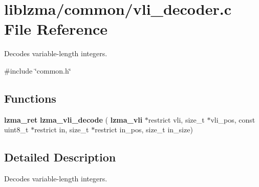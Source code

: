 \section{liblzma/common/vli\+\_\+decoder.c File Reference}
\label{vli__decoder_8c}


Decodes variable-\/length integers.  


{\ttfamily \#include \char`\"{}common.\+h\char`\"{}}\newline
\subsection*{Functions}
\begin{DoxyCompactItemize}
\item 
\mbox{\label{vli__decoder_8c_aba209ec14273c2c05697bd76529b6969}} 
\textbf{ lzma\+\_\+ret} {\bfseries lzma\+\_\+vli\+\_\+decode} (\textbf{ lzma\+\_\+vli} $\ast$restrict vli, size\+\_\+t $\ast$vli\+\_\+pos, const uint8\+\_\+t $\ast$restrict in, size\+\_\+t $\ast$restrict in\+\_\+pos, size\+\_\+t in\+\_\+size)
\end{DoxyCompactItemize}


\subsection{Detailed Description}
Decodes variable-\/length integers. 

